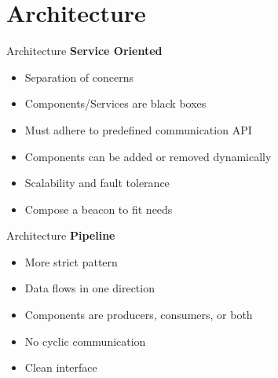 \section{Architecture}

\begin{frame}[t]{Architecture}
    \textbf{Service Oriented}
    \begin{itemize}
        \item Separation of concerns
        \item Components/Services are black boxes
        \item Must adhere to predefined communication API
        \item Components can be added or removed dynamically
        \item Scalability and fault tolerance
        \item Compose a beacon to fit needs
    \end{itemize}
\end{frame}
\begin{frame}[t]{Architecture}
    \textbf{Pipeline}
    \begin{itemize}
        \item More strict pattern
        \item Data flows in one direction
        \item Components are producers, consumers, or both
        \item No cyclic communication
        \item Clean interface
    \end{itemize}
\end{frame}

